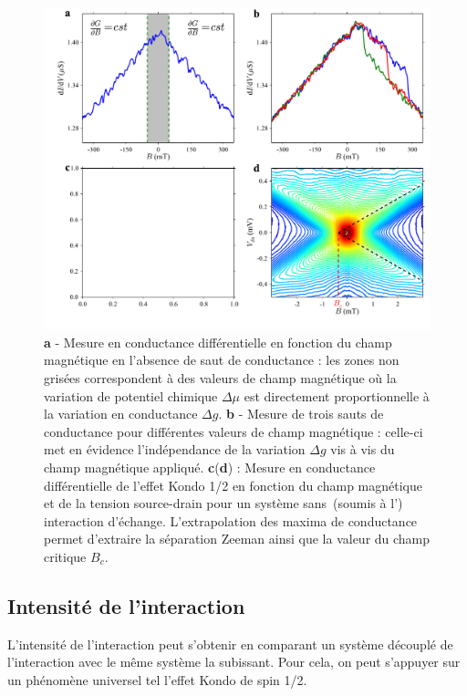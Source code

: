 \begin{figure}
\includegraphics[scale=0.45]{Resultats/AmplJump/AmplJump.pdf} 
\caption{\textbf{a} - Mesure en conductance différentielle en fonction du champ magnétique en l'absence de saut de conductance : les zones non grisées correspondent à des valeurs de champ magnétique où la variation de potentiel chimique $\Delta \mu$ est directement proportionnelle à la variation en conductance $\Delta g$. \textbf{b} - Mesure de trois sauts de conductance pour différentes valeurs de champ magnétique : celle-ci met en évidence l'indépendance de la variation $\Delta g$ vis à vis du champ magnétique appliqué. \textbf{c}(\textbf{d}) : Mesure en conductance différentielle de l'effet Kondo 1/2 en fonction du champ magnétique et de la tension source-drain pour un système sans~(soumis à l') interaction d'échange. L'extrapolation des maxima de conductance permet d'extraire la séparation Zeeman ainsi que la valeur du champ critique $B_c$.}
\label{analyse_interaction}
\end{figure}

\subsection{Intensité de l'interaction}
L'intensité de l'interaction peut s'obtenir en comparant un système découplé de l'interaction avec le même système la subissant. Pour cela, on peut s'appuyer sur un phénomène universel tel l'effet Kondo de spin 1/2.

